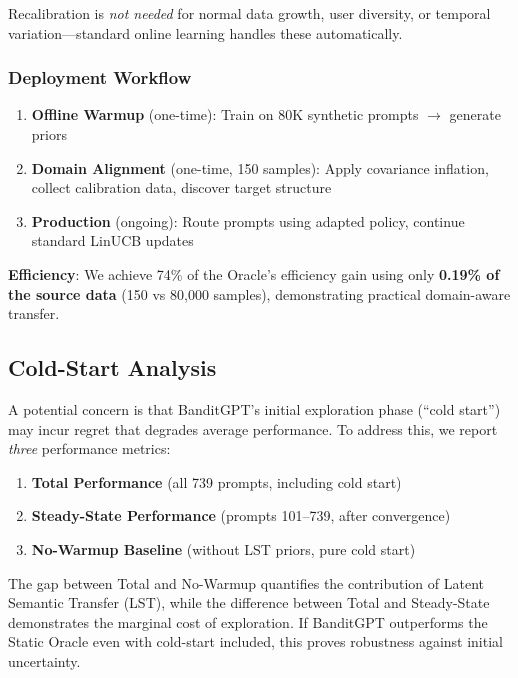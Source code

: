 Recalibration is \emph{not needed} for normal data growth, user diversity, or temporal variation—standard online learning handles these automatically.

\subsubsection{Deployment Workflow}

\begin{enumerate}
    \item \textbf{Offline Warmup} (one-time): Train on 80K synthetic prompts $\to$ generate priors
    \item \textbf{Domain Alignment} (one-time, 150 samples): Apply covariance inflation, collect calibration data, discover target structure
    \item \textbf{Production} (ongoing): Route prompts using adapted policy, continue standard LinUCB updates
\end{enumerate}

\textbf{Efficiency}: We achieve 74\% of the Oracle's efficiency gain using only \textbf{0.19\% of the source data} (150 vs 80,000 samples), demonstrating practical domain-aware transfer.

\subsection{Cold-Start Analysis}

A potential concern is that BanditGPT's initial exploration phase (``cold start'') may incur regret that degrades average performance. To address this, we report \emph{three} performance metrics:

\begin{enumerate}
    \item \textbf{Total Performance} (all 739 prompts, including cold start)
    \item \textbf{Steady-State Performance} (prompts 101--739, after convergence)
    \item \textbf{No-Warmup Baseline} (without LST priors, pure cold start)
\end{enumerate}

The gap between Total and No-Warmup quantifies the contribution of Latent Semantic Transfer (LST), while the difference between Total and Steady-State demonstrates the marginal cost of exploration. If BanditGPT outperforms the Static Oracle even with cold-start included, this proves robustness against initial uncertainty.

